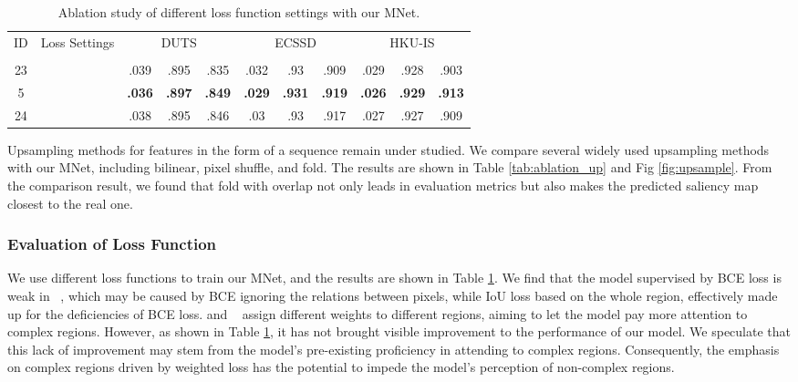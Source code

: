 \documentclass[lettersize,journal]{IEEEtran}
\begin{document}
\begin{table}
	\centering
	\scriptsize
	\caption{Ablation study of different loss function settings with our MNet. }\label{tab:ablation_loss}
\setlength\tabcolsep{0mm}
\begin{tabular}{c|c|ccc|ccc|ccc}\hline
	\multirow{2}{*}{ID} & \multirow{2}{*}{Loss Settings} & \multicolumn{3}{c|}{DUTS} & \multicolumn{3}{c|}{ECSSD} & \multicolumn{3}{c}{HKU-IS}\\
	&&  &  &  &  &  &  &  &  &  \\
	\hline
	23 &  & .039 & {.895} & {.835} & {.032} & {.93} & {.909} & {.029} & {.928} & {.903} \\
	5 &  & \textbf{.036} & \textbf{.897} & \textbf{.849} & \textbf{.029} & \textbf{.931} & \textbf{.919} & \textbf{.026} & \textbf{.929} & \textbf{.913} \\
24 & \cite{F3Net} & .038 & {.895} & {.846} & {.03} & {.93} & {.917} & {.027} & {.927} & {.909} \\
	
	\hline    
\end{tabular}
\end{table}
Upsampling methods for features in the form of a sequence remain under studied. We compare several widely used upsampling methods with our MNet, including bilinear, pixel shuffle, and fold. The results are shown in Table \ref{tab:ablation_up} and Fig \ref{fig:upsample}. From the comparison result, we found that fold with overlap not only leads in evaluation metrics but also makes the predicted saliency map closest to the real one. 

\subsubsection{Evaluation of Loss Function}
We use different loss functions to train our MNet, and the results are shown in Table \ref{tab:ablation_loss}. We find that the model supervised by BCE loss is weak in ~\cite{6909433}, which may be caused by BCE ignoring the relations between pixels, while IoU loss based on the whole region, effectively made up for the deficiencies of BCE loss.  and ~\cite{F3Net} assign different weights to different regions, aiming to let the model pay more attention to complex regions. However, as shown in Table \ref{tab:ablation_loss}, it has not brought visible improvement to the performance of our model. 
We speculate that this lack of improvement may stem from the model's pre-existing proficiency in attending to complex regions. 
Consequently, the emphasis on complex regions driven by weighted loss has the potential to impede the model's perception of non-complex regions. 
\end{document}
